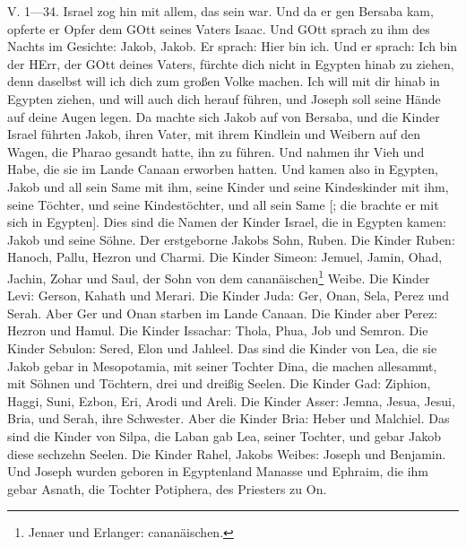 V. 1—34. Israel zog hin mit allem, das sein war. Und da er gen Bersaba kam, opferte er Opfer dem GOtt seines Vaters Isaac. Und GOtt sprach zu ihm des Nachts im Gesichte: Jakob, Jakob. Er sprach: Hier bin ich. Und er sprach: Ich bin der HErr, der GOtt deines Vaters, fürchte dich nicht in Egypten hinab zu ziehen, denn daselbst will ich dich zum großen Volke machen. Ich will mit dir hinab in Egypten ziehen, und will auch dich herauf führen, und Joseph soll seine Hände auf deine Augen legen. Da machte sich Jakob auf von Bersaba, und die Kinder Israel führten Jakob, ihren Vater, mit ihrem Kindlein und Weibern auf den Wagen, die Pharao gesandt hatte, ihn zu führen. Und nahmen ihr Vieh und Habe, die sie im Lande Canaan erworben hatten. Und kamen also in Egypten, Jakob und all sein Same mit ihm, seine Kinder und seine Kindeskinder mit ihm, seine Töchter, und seine Kindestöchter, und all sein Same [; die brachte er mit sich in Egypten]. Dies sind die Namen der Kinder Israel, die in Egypten kamen: Jakob und seine Söhne. Der erstgeborne Jakobs Sohn, Ruben. Die Kinder Ruben: Hanoch, Pallu, Hezron und Charmi. Die Kinder Simeon: Jemuel, Jamin, Ohad, Jachin, Zohar und Saul, der Sohn von dem cananäischen\footnote{Jenaer und Erlanger: cananäischen.} Weibe. Die Kinder Levi: Gerson, Kahath und Merari. Die Kinder Juda: Ger, Onan, Sela, Perez und Serah. Aber Ger und Onan starben im Lande Canaan. Die Kinder aber Perez: Hezron und Hamul. Die Kinder Issachar: Thola, Phua, Job und Semron. Die Kinder Sebulon: Sered, Elon und Jahleel. Das sind die Kinder von Lea, die sie Jakob gebar in Mesopotamia, mit seiner Tochter Dina, die machen allesammt, mit Söhnen und Töchtern, drei und dreißig Seelen. Die Kinder Gad: Ziphion, Haggi, Suni, Ezbon, Eri, Arodi und Areli. Die Kinder Asser: Jemna, Jesua, Jesui, Bria, und Serah, ihre Schwester. Aber die Kinder Bria: Heber und Malchiel. Das sind die Kinder von Silpa, die Laban gab Lea, seiner Tochter, und gebar Jakob diese sechzehn Seelen. Die Kinder Rahel, Jakobs Weibes: Joseph und Benjamin. Und Joseph wurden geboren in Egyptenland Manasse und Ephraim, die ihm gebar Asnath, die Tochter Potiphera, des Priesters zu On.
